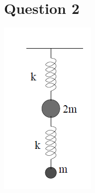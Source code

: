 \documentclass[12pt]{article}
\begin{document}
\section{Question 2}
\includegraphics[scale=1]{2.png}
\end{document}
